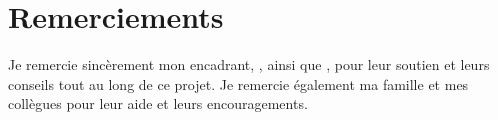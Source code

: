 \chapter*{Remerciements}

Je remercie sincèrement mon encadrant, \supervisor, ainsi que \cosupervisor, pour leur soutien et leurs conseils tout au long de ce projet. Je remercie également ma famille et mes collègues pour leur aide et leurs encouragements.
